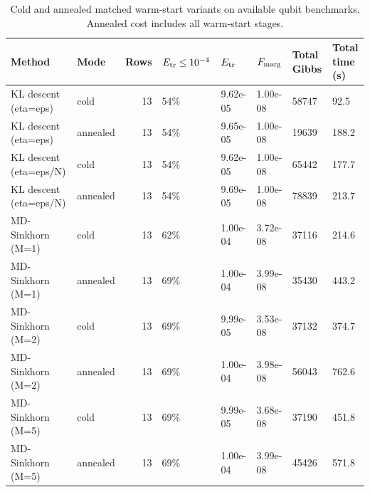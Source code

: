 \begin{table}
\caption{Cold and annealed matched warm-start variants on available qubit benchmarks. Annealed cost includes all warm-start stages.}
\label{tab:warm-qubit}
\begin{tabular}{llrlllll}
\toprule
Method & Mode & Rows & $E_{\rm tr}\le 10^{-4}$ & $E_{\rm tr}$ & $F_{\rm marg}$ & Total Gibbs & Total time (s) \\
\midrule
KL descent (eta=eps) & cold & 13 & 54\% & 9.62e-05 & 1.00e-08 & 58747 & 92.5 \\
KL descent (eta=eps) & annealed & 13 & 54\% & 9.65e-05 & 1.00e-08 & 19639 & 188.2 \\
KL descent (eta=eps/N) & cold & 13 & 54\% & 9.62e-05 & 1.00e-08 & 65442 & 177.7 \\
KL descent (eta=eps/N) & annealed & 13 & 54\% & 9.69e-05 & 1.00e-08 & 78839 & 213.7 \\
MD-Sinkhorn (M=1) & cold & 13 & 62\% & 1.00e-04 & 3.72e-08 & 37116 & 214.6 \\
MD-Sinkhorn (M=1) & annealed & 13 & 69\% & 1.00e-04 & 3.99e-08 & 35430 & 443.2 \\
MD-Sinkhorn (M=2) & cold & 13 & 69\% & 9.99e-05 & 3.53e-08 & 37132 & 374.7 \\
MD-Sinkhorn (M=2) & annealed & 13 & 69\% & 1.00e-04 & 3.98e-08 & 56043 & 762.6 \\
MD-Sinkhorn (M=5) & cold & 13 & 69\% & 9.99e-05 & 3.68e-08 & 37190 & 451.8 \\
MD-Sinkhorn (M=5) & annealed & 13 & 69\% & 1.00e-04 & 3.99e-08 & 45426 & 571.8 \\
\bottomrule
\end{tabular}
\end{table}
